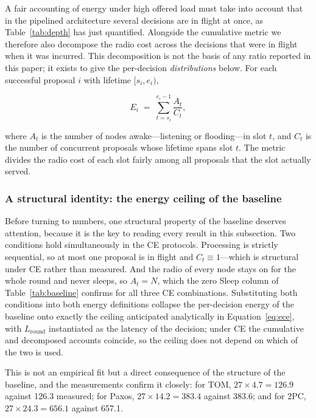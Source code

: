 \documentclass[journal]{IEEEtran}
\newcommand{\CE}{CE}                      %
\newcommand{\Nnodes}{N}                   %
\newcommand{\Lround}{L_{\mathrm{round}}}  %
\begin{document}
A fair accounting of energy under high offered load must take into account
that in the pipelined architecture several decisions are in flight at
once, as Table~\ref{tab:depth} has just quantified. Alongside the cumulative
metric we therefore also decompose the radio cost across the decisions that
were in flight when it was incurred. This decomposition is not the basis of
any ratio reported in this paper; it exists to give the per-decision
\emph{distributions} below. For each
successful proposal $i$ with lifetime $[s_i, e_i)$,

\begin{equation}
\label{eq:amortized}
E_i \;=\; \sum_{t=s_i}^{e_i-1} \frac{A_t}{C_t} ,
\end{equation}

where $A_t$ is the number of nodes awake---listening or flooding---in slot
$t$, and $C_t$ is the number of concurrent proposals whose lifetime spans
slot $t$. The metric divides the radio cost of each slot fairly among all
proposals that the slot actually served.

\subsubsection{A structural identity: the energy ceiling of the baseline}

Before turning to numbers, one structural property of the baseline
deserves attention, because it is the key to reading every result in this
subsection. Two conditions hold simultaneously in the \CE{} protocols.
Processing is strictly sequential, so at most one proposal is in flight
and $C_t \equiv 1$---which is structural under \CE{} rather than measured.
And the radio of every node stays on
for the whole round and never sleeps, so $A_t = \Nnodes$, which the zero
Sleep column of Table~\ref{tab:baseline} confirms for all three \CE{}
combinations. Substituting both conditions into
both energy definitions collapse the per-decision energy of the baseline
onto exactly the ceiling anticipated analytically in
Equation~\eqref{eq:ece}, with $\Lround$ instantiated as the latency of the
decision; under \CE{} the cumulative and decomposed accounts coincide, so the
ceiling does not depend on which of the two is used.

This is not an empirical fit but a direct consequence of the structure of
the baseline, and the measurements confirm it closely: for TOM,
$27 \times 4.7 = 126.9$ against 126.3 measured; for Paxos,
$27 \times 14.2 = 383.4$ against 383.6; and for 2PC,
$27 \times 24.3 = 656.1$ against 657.1.
\end{document}
